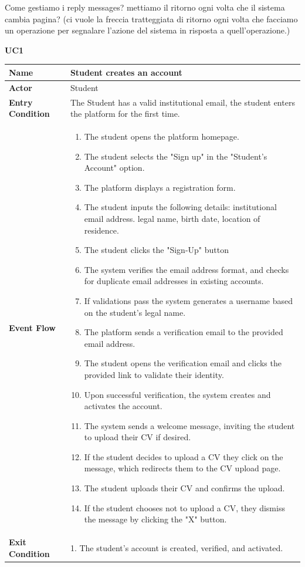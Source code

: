Come gestiamo i reply messages? mettiamo il ritorno ogni volta che il sistema cambia pagina? (ci vuole la freccia tratteggiata di ritorno ogni volta che facciamo un operazione per segnalare l'azione del sistema in risposta a quell'operazione.)

\textbf{UC1}

\begin{longtable}{|p{}|p{}|}
\hline
\textbf{Name} & Student creates an account \\
\hline
\textbf{Actor} & Student\\
\hline
\textbf{Entry Condition} & The Student has a valid institutional email, the student enters the platform for the first time.\\
\hline
\textbf{Event Flow} & 
\begin{enumerate}
    \item The student opens the platform homepage.
    \item The student selects the "Sign up" in the "Student's Account" option.
    \item The platform displays a registration form.
    \item The student inputs the following details:	institutional email address. legal name, birth date, location of residence.
    \item The student clicks the "Sign-Up" button
    \item The system verifies the email address format, and checks for duplicate email addresses in existing accounts.
    \item  If validations pass the system generates a username based on the student’s legal name.
    \item The platform sends a verification email to the provided email address.
    \item The student opens the verification email and clicks the provided link to validate their identity.
    \item Upon successful verification, the system creates and activates the account.
    \item The system sends a welcome message, inviting the student to upload their CV if desired.
    \item  If the student decides to upload a CV they click on the message, which redirects them to the CV upload page.
    \item The student uploads their CV and confirms the upload.
    \item If the student chooses not to upload a CV, they dismiss the message by clicking the "X" button.
\end{enumerate} \\
\hline
\textbf{Exit Condition} & 
1. The student’s account is created, verified, and activated.


\end{longtable}
